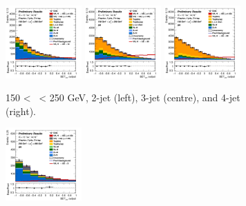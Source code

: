 \vspace*{\fill}
\begin{figure}[h!]
    \centering
    \begin{subfigure}[b]{\textwidth}
        \centering
        \includegraphics[width=0.32\textwidth]{Images/VH/Own_fit/postfit_VHbb/Region_distmva_BMax250_BMin150_DSR_J2_TTypebb_T2_L0_Y6051_GlobalFit_conditionnal_mu1.png}
        \includegraphics[width=0.32\textwidth]{Images/VH/Own_fit/postfit_VHbb/Region_distmva_BMax250_BMin150_DSR_J3_TTypebb_T2_L0_Y6051_GlobalFit_conditionnal_mu1.png}
        \includegraphics[width=0.32\textwidth]{Images/VH/Own_fit/postfit_VHbb/Region_distmva_BMax250_BMin150_DSR_J4_TTypebb_T2_L0_Y6051_GlobalFit_conditionnal_mu1.png}
        \caption{150 < \ptv\ < 250 GeV, 2-jet (left), 3-jet (centre), and 4-jet (right).}
        \label{fig:plots_VHbb_OL_150_SR}
    \end{subfigure}
    \begin{subfigure}[b]{\textwidth}
        \centering
        \includegraphics[width=0.32\textwidth]{Images/VH/Own_fit/postfit_VHbb/Region_distmva_BMax400_BMin250_DSR_J2_TTypebb_T2_L0_Y6051_GlobalFit_conditionnal_mu1.png}

\end{subfigure}
\end{figure}
